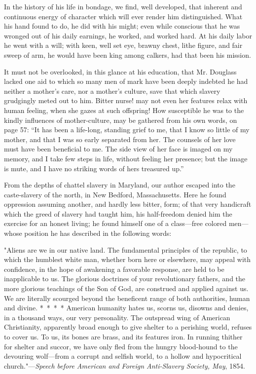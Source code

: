 In the history of his life in bondage, we find, well developed, that
inherent and continuous energy of character which will ever render him
distinguished. What his hand found to do, he did with his might; even
while conscious that he was wronged out of his daily earnings, he
worked, and worked hard. At his daily labor he went with a will; with
keen, well set eye, brawny chest, lithe figure, and fair sweep of arm,
he would have been king among calkers, had that been his mission.

It must not be overlooked, in this glance at his education, that Mr.
Douglass lacked one aid to which so many men of mark have been deeply
indebted he had neither a mother's care, nor a mother's culture, save
that which slavery grudgingly meted out to him. Bitter nurse! may not
even her features relax with human feeling, when she gazes at such
offspring! How susceptible he was to the kindly influences of
mother-culture, may be gathered from his own words, on page 57: ``It has
been a life-long, standing grief to me, that I know so little of my
mother, and that I was so early separated from her. The counsels of her
love must have been beneficial to me. The side view of her face is
imaged on my memory, and I take few steps in life, without feeling her
presence; but the image is mute, and I have no striking words of hers
treasured up.''

From the depths of chattel slavery in Maryland, our author escaped into
the caste-slavery of the north, in New Bedford, Massachusetts. Here he
found oppression assuming another, and hardly less bitter, form; of that
very handicraft which the greed of slavery had taught him, his
half-freedom denied him the exercise for an honest living; he found
himself one of a class---free colored men---whose position he has
described in the following words:

"Aliens are we in our native land. The fundamental principles of the
republic, to which the humblest white man, whether born here or
elsewhere, may appeal with confidence, in the hope of {}awakening a
favorable response, are held to be inapplicable to us. The glorious
doctrines of your revolutionary fathers, and the more glorious teachings
of the Son of God, are construed and applied against us. We are
literally scourged beyond the beneficent range of both authorities,
human and divine. {*~*~*~*} American humanity hates us, scorns us,
disowns and denies, in a thousand ways, our very personality. The
outspread wing of American Christianity, apparently broad enough to give
shelter to a perishing world, refuses to cover us. To us, its bones are
brass, and its features iron. In running thither for shelter and succor,
we have only fled from the hungry blood-hound to the devouring
wolf---from a corrupt and selfish world, to a hollow and hypocritical
church."---\emph{Speech before American and Foreign Anti-Slavery
Society, May}, 1854.

